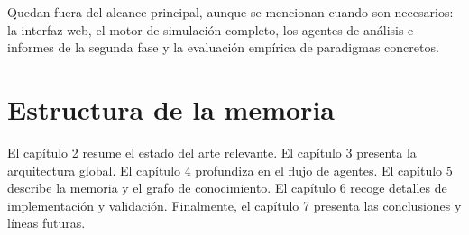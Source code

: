 Quedan fuera del alcance principal, aunque se mencionan cuando son necesarios:
la interfaz web, el motor de simulación completo, los agentes de análisis e
informes de la segunda fase y la evaluación empírica de paradigmas concretos.

\section{Estructura de la memoria}

El capítulo 2 resume el estado del arte relevante. El capítulo 3 presenta la
arquitectura global. El capítulo 4 profundiza en el flujo de agentes. El
capítulo 5 describe la memoria y el grafo de conocimiento. El capítulo 6 recoge
detalles de implementación y validación. Finalmente, el capítulo 7 presenta las
conclusiones y líneas futuras.
